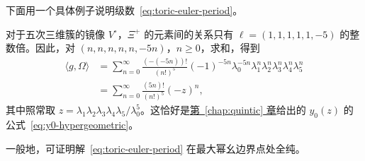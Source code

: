 下面用一个具体例子说明级数~\eqref{eq:toric-euler-period}。

\begin{example}\leavevmode{}\label{ex:quintic-hypergeometric-mirror-map}%
对于五次三维簇的镜像 $V^\circ$，$\Xi^+$ 的元素间的关系只有 $\ell=(1,1,1,1,1,-5)$ 的整数倍。因此，对 $(n,n,n,n,n,-5n)$，$n\geq0$，求和，得到
\begin{equation}\label{eq:quintic-euler-period}
\begin{aligned}
\langle g,\Omega\rangle
&=\sum_{n=0}^\infty\frac{(-(-5n))!}{(n!)^5}
(-1)^{-5n}\lambda_0^{-5n}\lambda_1^n\lambda_2^n\lambda_3^n\lambda_4^n\lambda_5^n\\
&=\sum_{n=0}^\infty\frac{(5n)!}{(n!)^5}(-z)^n,
\end{aligned}
\end{equation}
其中照常取 $z=\lambda_1\lambda_2\lambda_3\lambda_4\lambda_5/\lambda_0^5$。这恰好是\hyperref[chap:quintic]{第~\ref*{chap:quintic} 章}给出的 $y_0(z)$ 的公式~\eqref{eq:y0-hypergeometric}。
\end{example}

一般地，可证明解~\eqref{eq:toric-euler-period} 在最大幂幺边界点处全纯。


